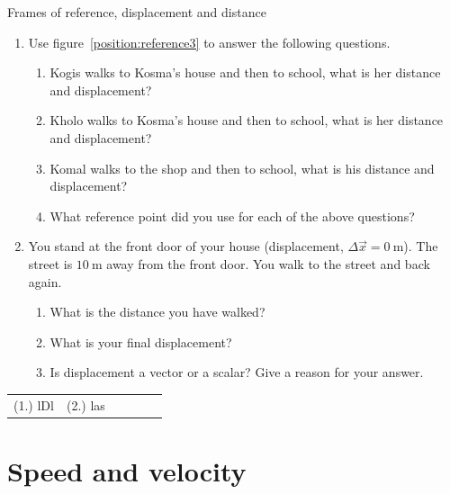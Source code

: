 \begin{exercises}{Frames of reference, displacement and distance}
            \nopagebreak \noindent
        \label{m38788*id64042}\begin{enumerate}[noitemsep, label=\textbf{\arabic*}. ] 
            \label{m38788*uid20}\item Use figure~\ref{position:reference3}  to answer the following questions.
\label{m38788*id64060}\begin{enumerate}[noitemsep, label=\textbf{\alph*}. ] 
            \label{m38788*uid21}\item Kogis walks to Kosma's house and then to school, what is her distance and displacement?
\label{m38788*uid22}\item Kholo walks to Kosma's house and then to school, what is her distance and displacement?
\label{m38788*uid23}\item Komal walks to the shop and then to school, what is his distance and displacement?
\label{m38788*uid24}\item What reference point did you use for each of the above questions?
\end{enumerate}
                \label{m38788*uid25}\item You stand at the front door of your house (displacement, $\Delta \vec{x}=0~\text{m}$). The street is $10~\text{m}$ away from the front door. You walk to the street and back again.
\label{m38788*id64141}\begin{enumerate}[noitemsep, label=\textbf{\alph*}. ] 
            \label{m38788*uid26}\item What is the distance you have walked?
\label{m38788*uid27}\item What is your final displacement?
\label{m38788*uid28}\item Is displacement a vector or a scalar? Give a reason for your answer.
\end{enumerate}
                \end{enumerate}
  \label{m38788**end}
\par \practiceinfo
 \par \begin{tabular}[h]{cccccc}
 (1.) lDl  &  (2.) las  & \end{tabular}
\end{exercises}
         \section{Speed and velocity} 
    \nopagebreak

